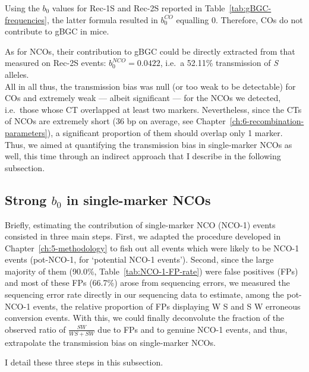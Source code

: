 Using the $b_0$ values for Rec-1S and Rec-2S reported in Table~\ref{tab:gBGC-frequencies}, the latter formula resulted in $b_0^{CO}$ equalling 0. 
Therefore, COs do not contribute to gBGC in mice.

As for NCOs, their contribution to gBGC could be directly extracted from that measured on Rec-2S events: $b_0^{NCO} = 0.0422$, i.e.\ a 52.11\% transmission of \textit{S} alleles.\\

All in all thus, the transmission bias was null (or too weak to be detectable) for COs and extremely weak — albeit significant — for the NCOs we detected, i.e.\ those whose CT overlapped at least two markers.
Nevertheless, since the CTs of NCOs are extremely short (36 bp on average, see Chapter~\ref{ch:6-recombination-parameters}), a significant proportion of them should overlap only 1 marker.
Thus, we aimed at quantifying the transmission bias in single-marker NCOs as well, this time through an indirect approach that I describe in the following subsection.

\subsection{Strong $b_0$ in single-marker NCOs}

Briefly, estimating the contribution of single-marker NCO (NCO-1) events consisted in three main steps.
First, we adapted the procedure developed in Chapter~\ref{ch:5-methodology} to fish out all events which were likely to be NCO-1 events (pot-NCO-1, for ‘potential NCO-1 events’).
Second, since the large majority of them (90.0\%, Table~\ref{tab:NCO-1-FP-rate}) were false positives (FPs) and most of these FPs (66.7\%) arose from sequencing errors, we measured the sequencing error rate directly in our sequencing data to estimate, among the pot-NCO-1 events, the relative proportion of FPs displaying W\textrightarrow{} S and S\textrightarrow{} W erroneous conversion events.
With this, we could finally deconvolute the fraction of the observed ratio of $\frac{SW}{WS+SW}$ due to FPs and to genuine NCO-1 events, and thus, extrapolate the transmission bias on single-marker NCOs.

I detail these three steps in this subsection.



